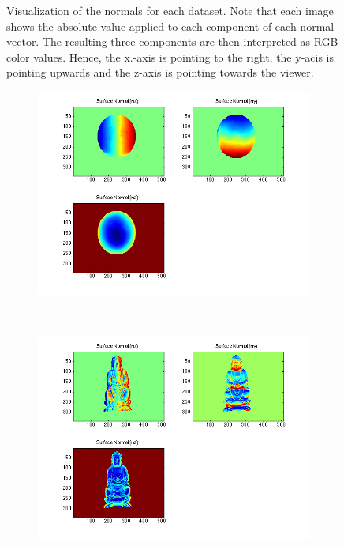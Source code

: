 \documentclass{paper}
\begin{document}
\begin{figure}[h!]
\begin{subfigure}{0.3\textwidth}
    \end{subfigure}
    \caption{Visualization of the normals for each dataset. Note that each image shows the absolute value applied to each component of each normal vector. The resulting three components are then interpreted as RGB color values. Hence, the x.-axis is pointing to the right, the y-acis is pointing upwards and the z-axis is pointing towards the viewer. }
    \label{fig:normals}       
\end{figure}


\begin{figure}[h!]
    \centering
    \begin{subfigure}{0.45\textwidth}
        \includegraphics[width=\textwidth]{results/gray/gray_n_xyz}
    \end{subfigure}
    ~
    \begin{subfigure}{0.45\textwidth}
        \includegraphics[width=\textwidth]{results/buddha/buddha_n_xyz}
    \end{subfigure}
    

\end{figure}
\end{document}
